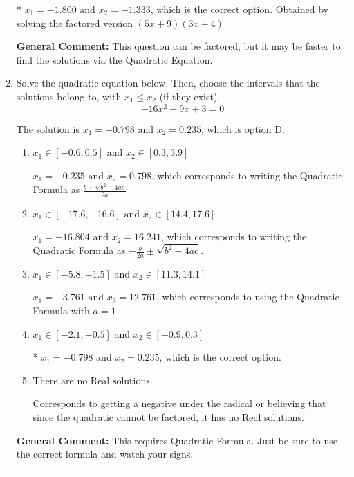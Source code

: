 \documentclass{extbook}[14pt]
\newcommand{\litem}[1]{\item #1

\rule{\textwidth}{0.4pt}}
\begin{document}
\begin{enumerate}
{\begin{enumerate}[label=\Alph*.]
* $x_1 = -1.800 \text{ and } x_2 = -1.333$, which is the correct option. Obtained by solving the factored version $(5x + 9)(3x + 4)$
\end{enumerate}

\textbf{General Comment:} This question can be factored, but it may be faster to find the solutions via the Quadratic Equation.
}
\litem{
Solve the quadratic equation below. Then, choose the intervals that the solutions belong to, with $x_1 \leq x_2$ (if they exist).
\[ -16x^{2} -9 x + 3 = 0 \]

The solution is \( x_1 = -0.798 \text{ and } x_2 = 0.235 \), which is option D.\begin{enumerate}[label=\Alph*.]
\item \( x_1 \in [-0.6, 0.5] \text{ and } x_2 \in [0.3, 3.9] \)

 $x_1 = -0.235 \text{ and } x_2 = 0.798$, which corresponds to writing the Quadratic Formula as $\frac{b \pm \sqrt{b^2 - 4ac}}{2a}$
\item \( x_1 \in [-17.6, -16.6] \text{ and } x_2 \in [14.4, 17.6] \)

 $x_1 = -16.804 \text{ and } x_2 = 16.241$, which corresponds to writing the Quadratic Formula as $-\frac{b}{2a} \pm \sqrt{b^2 - 4ac}$.
\item \( x_1 \in [-5.8, -1.5] \text{ and } x_2 \in [11.3, 14.1] \)

 $x_1 = -3.761 \text{ and } x_2 = 12.761$, which corresponds to using the Quadratic Formula with $a=1$
\item \( x_1 \in [-2.1, -0.5] \text{ and } x_2 \in [-0.9, 0.3] \)

* $x_1 = -0.798 \text{ and } x_2 = 0.235$, which is the correct option.
\item \( \text{There are no Real solutions.} \)

Corresponds to getting a negative under the radical or believing that since the quadratic cannot be factored, it has no Real solutions.
\end{enumerate}

\textbf{General Comment:} This requires Quadratic Formula. Just be sure to use the correct formula and watch your signs.
}
\end{enumerate}
\end{document}
